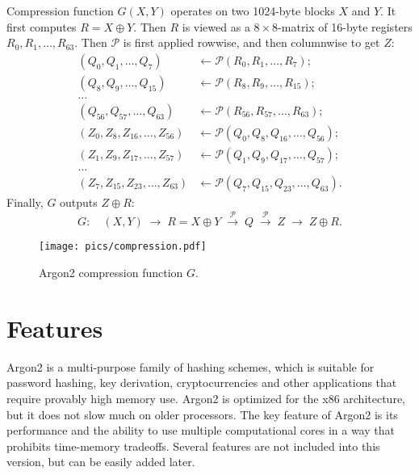 \documentclass[a4paper]{article}
\begin{document}
Compression function ${G}(X,Y)$ operates on two 1024-byte blocks $X$ and $Y$. It first computes $R=X\oplus Y$. Then $R$ is viewed as a $8\times 8$-matrix of 16-byte registers $R_0, R_1,\ldots, R_{63}.$ Then
$\mathcal{P}$ is first applied rowwise, and then columnwise to get $Z$:
\begin{align*}
    (Q_0,Q_1,\ldots,Q_7) &\leftarrow \mathcal{P}(R_0,R_1,\ldots,R_7);\\
        (Q_8,Q_9,\ldots,Q_{15})&\leftarrow \mathcal{P}(R_8,R_9,\ldots,R_{15});\\
        \ldots&\\
        (Q_{56},Q_{57},\ldots,Q_{63})&\leftarrow \mathcal{P}(R_{56},R_{57},\ldots,R_{63});\\[10pt]
        (Z_0,Z_8,Z_{16},\ldots,Z_{56})&\leftarrow \mathcal{P}(Q_0,Q_8,Q_{16},\ldots,Q_{56});\\
        (Z_1,Z_9,Z_{17},\ldots,Z_{57})&\leftarrow     \mathcal{P}(Q_1,Q_9,Q_{17},\ldots,Q_{57});\\
        \ldots&\\
        (Z_7,Z_{15},Z_{23},\ldots,Z_{63})&\leftarrow \mathcal{P}(Q_7,Q_{15},Q_{23},\ldots,Q_{63}).
  \end{align*}
  Finally, $G$ outputs $Z\oplus R$:
  $$
  G:\quad (X,Y)\; \rightarrow\; R = X\oplus Y\; \xrightarrow{\mathcal{P}}\;Q\;\xrightarrow{\mathcal{P}}\;Z\;
  \rightarrow \;Z\oplus R.
  $$
  
  \begin{figure}[ht]
  \ifpdf
\begin{center}
  \texttt{[image: pics/compression.pdf]}
  \caption{Argon2 compression function $G$. }\label{fig:compression}
\end{center}
\fi
  \end{figure}
  
  \section{Features}

\textsf{Argon2} is a multi-purpose family of  hashing schemes, which is suitable for password hashing, key derivation, cryptocurrencies and other applications that require provably high memory use. \textsf{Argon2} is optimized for the x86 architecture, but it does not slow much on older processors. The key feature of \textsf{Argon2} is its performance and the ability to use multiple computational cores in a way that prohibits time-memory tradeoffs. Several features are not included into this version, but can be easily added later.
\end{document}

